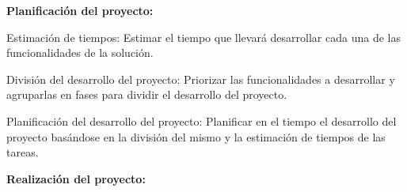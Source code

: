 \textbf{Planificación del proyecto:}
\begin{description}[
    labelindent=2em,
    leftmargin=!,
    labelwidth=1.5cm,
    labelsep=1em,
    font=\normalfont
  ]

  \item[TFP-1.] Estimación de tiempos: Estimar el tiempo que llevará desarrollar cada una de las funcionalidades de la solución.
  \item[TFP-2.] División del desarrollo del proyecto: Priorizar las funcionalidades a desarrollar y agruparlas en fases para dividir el desarrollo del proyecto.
  \item[TFP-3.] Planificación del desarrollo del proyecto: Planificar en el tiempo el desarrollo del proyecto basándose en la división del mismo y la estimación de tiempos de las tareas.
\end{description}
\textbf{Realización del proyecto:}
